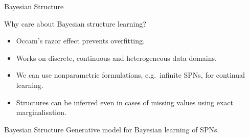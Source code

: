 \begin{frame}{Bayesian Structure}
\begin{block}{Why care about Bayesian structure learning?}
\begin{itemize}
        \item Occam's razor effect prevents overfitting.
        \item Works on discrete, continuous and heterogeneous data domains.
        \item We can use nonparametric formulations, e.g.~infinite SPNs, for continual learning.
        \item Structures can be inferred even in cases of missing values using exact marginalisation.
    \end{itemize}
\end{block}
\end{frame}

\begin{frame}{Bayesian Structure}
Generative model for Bayesian learning of SPNs.
\begin{figure}
    \centering
\end{figure}
\end{frame}

